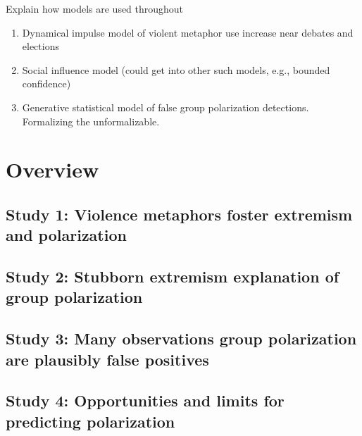 \documentclass[12pt,letterpaper]{article}
\begin{document}
Explain how models are used throughout
\begin{enumerate}
  \item 
    Dynamical impulse model of violent metaphor use 
    increase near debates and elections
  \item
    Social influence model (could get into other such models, e.g., bounded confidence)
  \item
    Generative statistical model of false group polarization detections.
    Formalizing the unformalizable.
\end{enumerate}

\section{Overview}


\subsection{Study 1: Violence metaphors foster extremism and polarization}

\subsection{Study 2: Stubborn extremism explanation of group polarization}

\subsection{Study 3: Many observations group polarization are plausibly false positives}

\subsection{Study 4: Opportunities and limits for predicting polarization}





\setlength{\bibleftmargin}{.125in}
\setlength{\bibindent}{-\bibleftmargin}


\end{document}
